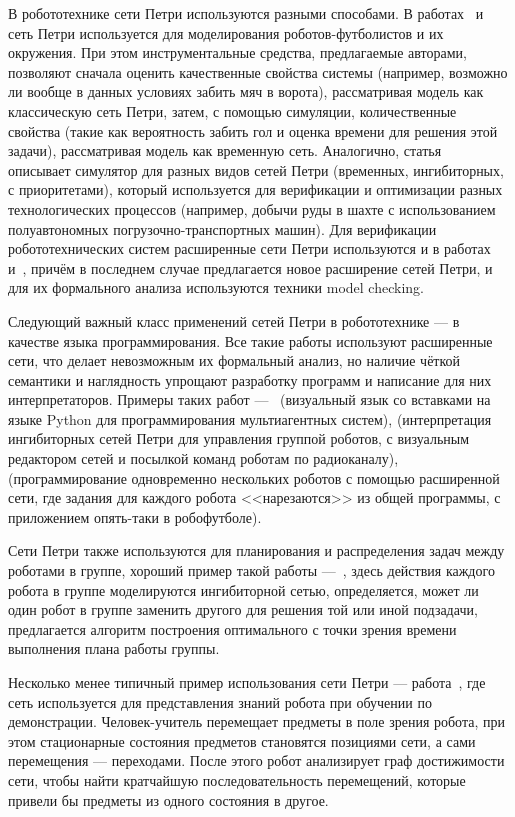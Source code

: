 \documentclass[conference]{IEEEtran}
\begin{document}
В робототехнике сети Петри используются разными способами. В работах~\cite{costelha2003petri}
и~\cite{costelha2010petri} сеть Петри используется для моделирования 
роботов-футболистов и их окружения. При этом инструментальные средства, предлагаемые 
авторами, позволяют сначала оценить качественные свойства системы (например, 
возможно ли вообще в данных условиях забить мяч в ворота), рассматривая модель 
как классическую сеть Петри, затем, с помощью симуляции, количественные свойства 
(такие как вероятность забить гол и оценка времени для решения этой задачи), 
рассматривая модель как временную сеть. Аналогично, статья~\cite{konukh2009imitation} 
описывает симулятор для разных видов сетей Петри (временных, ингибиторных, 
с приоритетами), который используется для верификации и оптимизации разных 
технологических процессов (например, добычи руды в шахте с использованием 
полуавтономных погрузочно-транспортных машин). Для верификации робототехнических 
систем расширенные сети Петри используются и в работах~\cite{aguiar2010petri} 
и~\cite{fu2014reconfigurable}, причём в последнем случае предлагается новое 
расширение сетей Петри, и для их формального анализа используются техники 
model checking.

Следующий важный класс применений сетей Петри в робототехнике --- в качестве 
языка программирования. Все такие работы используют расширенные сети, что делает 
невозможным их формальный анализ, но наличие чёткой семантики и наглядность 
упрощают разработку программ и написание для них интерпретаторов. Примеры таких 
работ ---~\cite{simon2010pytri} (визуальный язык со вставками на языке Python 
для программирования мультиагентных систем), \cite{kashima2001mobile} (интерпретация 
ингибиторных сетей Петри для управления группой роботов, с визуальным редактором 
сетей и посылкой команд роботам по радиоканалу), \cite{palamara2008soccer} 
(программирование одновременно нескольких роботов с помощью расширенной сети, 
где задания для каждого робота <<нарезаются>> из общей программы, с приложением 
опять-таки в робофутболе). 

Сети Петри также используются для планирования и распределения задач между 
роботами в группе, хороший пример такой работы ---~\cite{kotb2007multiagent}, 
здесь действия каждого робота в группе моделируются ингибиторной сетью, 
определяется, может ли один робот в группе заменить другого для решения той или 
иной подзадачи, предлагается алгоритм построения оптимального с точки зрения 
времени выполнения плана работы группы.

Несколько менее типичный пример использования сети Петри --- работа~\cite{chang2013learning},
где сеть используется для представления знаний робота при обучении по 
демонстрации. Человек-учитель перемещает предметы в поле зрения 
робота, при этом стационарные состояния предметов становятся позициями сети, 
а сами перемещения --- переходами. После этого робот анализирует граф 
достижимости сети, чтобы найти кратчайшую последовательность перемещений, которые 
привели бы предметы из одного состояния в другое.
\end{document}
